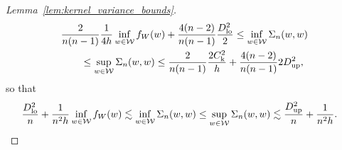 \begin{proof}[Lemma~\ref{lem:kernel_variance_bounds}]
  \begin{align*}
    &\frac{2}{n(n-1)}
    \frac{1}{4h}
    \inf_{w \in \mathcal{W}} f_W(w)
    + \frac{4(n-2)}{n(n-1)}
    \frac{D_{\textup{lo}}^2}{2}
    \leq
    \inf_{w \in \mathcal{W}} \Sigma_n(w,w) \\
    &\qquad\leq
    \sup_{w \in \mathcal{W}} \Sigma_n(w,w)
    \leq
    \frac{2}{n(n-1)}
    \frac{2 C_{\mathrm{k}}^2}{h}
    + \frac{4(n-2)}{n(n-1)}
    2 D_{\textup{up}}^2,
  \end{align*}
  so that
  \begin{align*}
    \frac{D_{\textup{lo}}^2}{n}
    + \frac{1}{n^2h}
    \inf_{w \in \mathcal{W}} f_W(w)
    &\lesssim
    \inf_{w \in \mathcal{W}} \Sigma_n(w,w)
    \leq
    \sup_{w \in \mathcal{W}} \Sigma_n(w,w)
    \lesssim
    \frac{D_{\textup{up}}^2}{n}
    + \frac{1}{n^2h}.
  \end{align*}
\end{proof}

